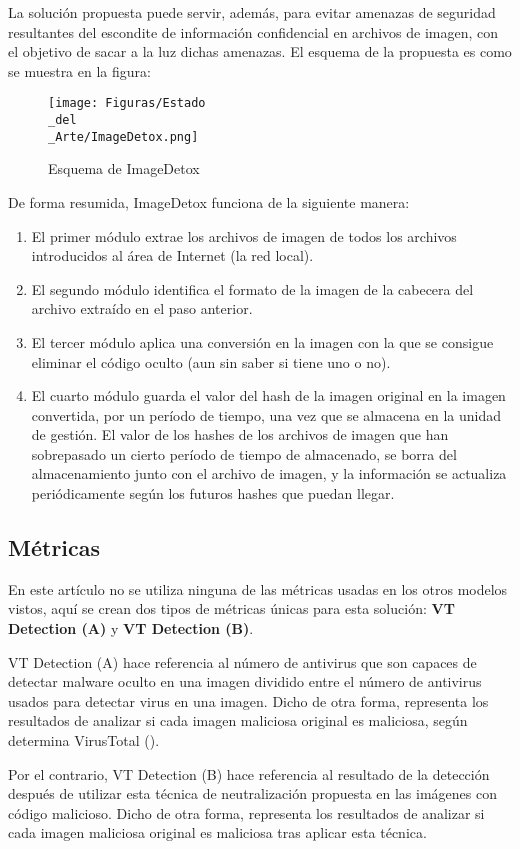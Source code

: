 La solución propuesta puede servir, además, para evitar amenazas de seguridad resultantes del escondite de información confidencial en archivos de imagen, con el objetivo de sacar a la luz dichas amenazas. El esquema de la propuesta es como se muestra en la figura:

\begin{figure}[H]
  \centering
  \texttt{[image: Figuras/Estado\\\_del\\\_Arte/ImageDetox.png]}
  \label{fig:ImageDetox}
  \caption{Esquema de ImageDetox}
\end{figure}

De forma resumida, ImageDetox funciona de la siguiente manera:
\begin{enumerate}
\item  El primer módulo extrae los archivos de imagen de todos los archivos introducidos al área de Internet (la red local).
\item El segundo módulo identifica el formato de la imagen de la cabecera del archivo extraído en el paso anterior.
\item El tercer módulo aplica una conversión en la imagen con la que se consigue eliminar el código oculto (aun sin saber si tiene uno o no).
\item El cuarto módulo guarda el valor del hash de la imagen original en la imagen convertida, por un período de tiempo, una vez que se almacena en la unidad de gestión. El valor de los hashes de los archivos de imagen que han sobrepasado un cierto período de tiempo de almacenado, se borra del almacenamiento junto con el archivo de imagen, y la información se actualiza periódicamente según los futuros hashes que puedan llegar.
\end{enumerate}

\subsection{Métricas}

En este artículo no se utiliza ninguna de las métricas usadas en los otros modelos vistos, aquí se crean dos tipos de métricas únicas para esta solución: \textbf{VT Detection (A)} y \textbf{VT Detection (B)}.

VT Detection (A) hace referencia al número de antivirus que son capaces de detectar malware oculto en una imagen dividido entre el número de antivirus usados para detectar virus en una imagen. Dicho de otra forma, representa los resultados de analizar si cada imagen maliciosa original es maliciosa, según determina VirusTotal (\cite{virustotal}). %

Por el contrario, VT Detection (B) hace referencia al resultado de la detección después de utilizar esta técnica de neutralización propuesta en las imágenes con código malicioso. Dicho de otra forma, representa los resultados de analizar si cada imagen maliciosa original es maliciosa tras aplicar esta técnica.
